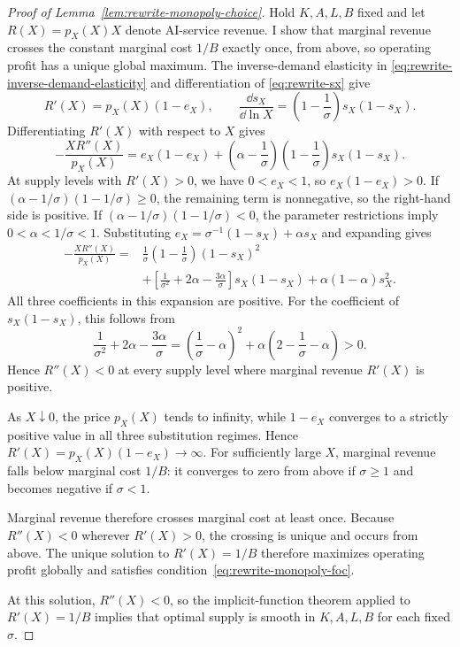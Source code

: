 \begin{proof}[Proof of Lemma~\ref{lem:rewrite-monopoly-choice}]
Hold \(K,A,L,B\) fixed and let \(R(X)=p_X(X)X\) denote AI-service revenue.
I show that marginal revenue crosses the constant marginal cost \(1/B\)
exactly once, from above, so operating profit has a unique global maximum.
The inverse-demand elasticity in \eqref{eq:rewrite-inverse-demand-elasticity}
and differentiation of \eqref{eq:rewrite-sx} give
\[
 R'(X)=p_X(X)(1-e_X),\qquad
 \frac{\dd s_X}{\dd\ln X}=\left(1-\frac1\sigma\right)s_X(1-s_X).
\]
Differentiating \(R'(X)\) with respect to \(X\) gives
\begin{equation}
 -\frac{XR''(X)}{p_X(X)}
 =e_X(1-e_X)+\left(\alpha-\frac1\sigma\right)
 \left(1-\frac1\sigma\right)s_X(1-s_X).
 \label{eq:rewrite-monopoly-proof-curvature}
\end{equation}
At supply levels with \(R'(X)>0\), we have \(0<e_X<1\), so
\(e_X(1-e_X)>0\).
If \((\alpha-1/\sigma)(1-1/\sigma)\geq0\), the remaining term is nonnegative,
so the right-hand side is positive.
If \((\alpha-1/\sigma)(1-1/\sigma)<0\), the parameter restrictions imply
\(0<\alpha<1/\sigma<1\).
Substituting \(e_X=\sigma^{-1}(1-s_X)+\alpha s_X\) and expanding gives
\[
 \begin{aligned}
 -\frac{XR''(X)}{p_X(X)}
 ={}&\frac1\sigma\left(1-\frac1\sigma\right)(1-s_X)^2\\
 &+\left[\frac1{\sigma^2}+2\alpha-\frac{3\alpha}{\sigma}\right]s_X(1-s_X)
 +\alpha(1-\alpha)s_X^2.
 \end{aligned}
\]
All three coefficients in this expansion are positive. For the coefficient
of \(s_X(1-s_X)\), this follows from
\[
 \frac1{\sigma^2}+2\alpha-\frac{3\alpha}{\sigma}
 =\left(\frac1\sigma-\alpha\right)^2
 +\alpha\left(2-\frac1\sigma-\alpha\right)>0.
\]
Hence \(R''(X)<0\) at every supply level where marginal revenue
\(R'(X)\) is positive.

As \(X\downarrow0\), the price \(p_X(X)\) tends to infinity, while
\(1-e_X\) converges to a strictly positive value in all three substitution
regimes. Hence \(R'(X)=p_X(X)(1-e_X)\to\infty\). For sufficiently large
\(X\), marginal revenue falls below marginal cost \(1/B\): it converges
to zero from above if \(\sigma\geq1\) and becomes negative if \(\sigma<1\).

Marginal revenue therefore crosses marginal cost at least once. Because
\(R''(X)<0\) wherever \(R'(X)>0\), the crossing is unique and occurs from
above. The unique solution to \(R'(X)=1/B\) therefore maximizes operating
profit globally and satisfies
condition~\eqref{eq:rewrite-monopoly-foc}.

At this solution, \(R''(X)<0\), so the implicit-function theorem applied
to \(R'(X)=1/B\) implies that optimal supply is smooth in \(K,A,L,B\)
for each fixed \(\sigma\).
\end{proof}

